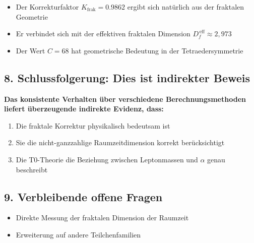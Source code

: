 \begin{itemize}
	\item Der Korrekturfaktor $K_{\text{frak}} = 0.9862$ ergibt sich natürlich aus der fraktalen Geometrie
	\item Er verbindet sich mit der effektiven fraktalen Dimension $D_f^{\,\text{eff}} \approx 2{,}973$
	\item Der Wert $C = 68$ hat geometrische Bedeutung in der Tetraedersymmetrie
\end{itemize}

\subsection{8. Schlussfolgerung: Dies ist indirekter Beweis}

\begin{tcolorbox}[colback=red!5!white,colframe=red!75!black]
	\textbf{Das konsistente Verhalten über verschiedene Berechnungsmethoden liefert überzeugende indirekte Evidenz, dass:}
	\begin{enumerate}
		\item Die fraktale Korrektur physikalisch bedeutsam ist
		\item Sie die nicht-ganzzahlige Raumzeitdimension korrekt berücksichtigt
		\item Die T0-Theorie die Beziehung zwischen Leptonmassen und $\alpha$ genau beschreibt
	\end{enumerate}
\end{tcolorbox}

\subsection{9. Verbleibende offene Fragen}

\begin{itemize}
	\item Direkte Messung der fraktalen Dimension der Raumzeit
	\item Erweiterung auf andere Teilchenfamilien
\end{itemize}
